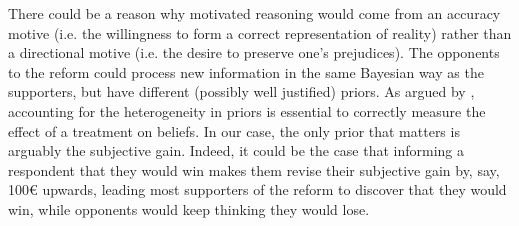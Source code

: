\documentclass[12pt]{article} %
\begin{document}
\begin{appendices}
There could be a reason why motivated reasoning would come from an accuracy motive (i.e. the willingness to form a correct representation of reality) rather than a directional motive (i.e. the desire to preserve one's prejudices). The opponents to the reform could process new information in the same Bayesian way as the supporters, but have different (possibly well justified) priors. As argued by \citet{cantoni_et_al_2019}, accounting for the heterogeneity in priors is essential to correctly measure the effect of a treatment on beliefs. In our case, the only prior that matters is arguably the subjective gain. Indeed, it could be the case that informing a respondent that they would win makes them revise their subjective gain by, say, 100\euro{} upwards, leading most supporters of the reform to discover that they would win, while opponents would keep thinking they would lose.





\end{appendices}
\end{document}
